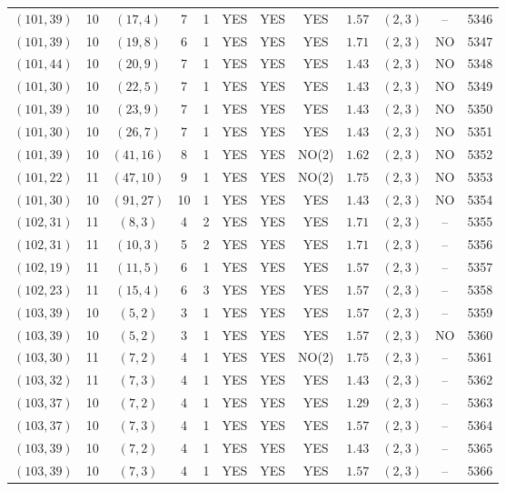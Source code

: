 \begin{longtable}{|c|c|c|c|c|c|c|c|c|c|c|c|}
$(101,39)$ & 10 & $(17,4)$ & 7 & 1 & YES & YES & YES & $1.57$ & $(2,3)$ & -- & 5346\\
$(101,39)$ & 10 & $(19,8)$ & 6 & 1 & YES & YES & YES & $1.71$ & $(2,3)$ & NO & 5347\\
$(101,44)$ & 10 & $(20,9)$ & 7 & 1 & YES & YES & YES & $1.43$ & $(2,3)$ & NO & 5348\\
$(101,30)$ & 10 & $(22,5)$ & 7 & 1 & YES & YES & YES & $1.43$ & $(2,3)$ & NO & 5349\\
$(101,39)$ & 10 & $(23,9)$ & 7 & 1 & YES & YES & YES & $1.43$ & $(2,3)$ & NO & 5350\\
$(101,30)$ & 10 & $(26,7)$ & 7 & 1 & YES & YES & YES & $1.43$ & $(2,3)$ & NO & 5351\\
$(101,39)$ & 10 & $(41,16)$ & 8 & 1 & YES & YES & NO(2) & $1.62$ & $(2,3)$ & NO & 5352\\
$(101,22)$ & 11 & $(47,10)$ & 9 & 1 & YES & YES & NO(2) & $1.75$ & $(2,3)$ & NO & 5353\\
$(101,30)$ & 10 & $(91,27)$ & 10 & 1 & YES & YES & YES & $1.43$ & $(2,3)$ & NO & 5354\\
$(102,31)$ & 11 & $(8,3)$ & 4 & 2 & YES & YES & YES & $1.71$ & $(2,3)$ & -- & 5355\\
$(102,31)$ & 11 & $(10,3)$ & 5 & 2 & YES & YES & YES & $1.71$ & $(2,3)$ & -- & 5356\\
$(102,19)$ & 11 & $(11,5)$ & 6 & 1 & YES & YES & YES & $1.57$ & $(2,3)$ & -- & 5357\\
$(102,23)$ & 11 & $(15,4)$ & 6 & 3 & YES & YES & YES & $1.57$ & $(2,3)$ & -- & 5358\\
$(103,39)$ & 10 & $(5,2)$ & 3 & 1 & YES & YES & YES & $1.57$ & $(2,3)$ & -- & 5359\\
$(103,39)$ & 10 & $(5,2)$ & 3 & 1 & YES & YES & YES & $1.57$ & $(2,3)$ & NO & 5360\\
$(103,30)$ & 11 & $(7,2)$ & 4 & 1 & YES & YES & NO(2) & $1.75$ & $(2,3)$ & -- & 5361\\
$(103,32)$ & 11 & $(7,3)$ & 4 & 1 & YES & YES & YES & $1.43$ & $(2,3)$ & -- & 5362\\
$(103,37)$ & 10 & $(7,2)$ & 4 & 1 & YES & YES & YES & $1.29$ & $(2,3)$ & -- & 5363\\
$(103,37)$ & 10 & $(7,3)$ & 4 & 1 & YES & YES & YES & $1.57$ & $(2,3)$ & -- & 5364\\
$(103,39)$ & 10 & $(7,2)$ & 4 & 1 & YES & YES & YES & $1.43$ & $(2,3)$ & -- & 5365\\
$(103,39)$ & 10 & $(7,3)$ & 4 & 1 & YES & YES & YES & $1.57$ & $(2,3)$ & -- & 5366\\

\end{longtable}
